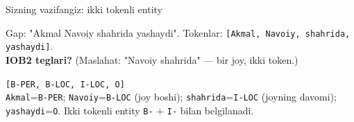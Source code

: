 \documentclass[aspectratio=169,11pt]{beamer}
\begin{document}
\begin{frame}{Sizning vazifangiz: ikki tokenli entity}
  \begin{tcolorbox}[warnbox,title=Savol --- 90 soniya]
    \small
    Gap: "Akmal Navoiy shahrida yashaydi". Tokenlar:
    \texttt{[Akmal, Navoiy, shahrida, yashaydi]}.\\[4pt]
    \textbf{\large IOB2 teglari? } (Maslahat: "Navoiy shahrida" --- bir joy, ikki token.)
  \end{tcolorbox}
  \pause
  \begin{tcolorbox}[okbox,title=Javob]
    \small
    \texttt{[B-PER, B-LOC, I-LOC, O]}\\[3pt]
    \footnotesize \texttt{Akmal}=\texttt{B-PER}; \texttt{Navoiy}=\texttt{B-LOC} (joy boshi);
    \texttt{shahrida}=\texttt{I-LOC} (joyning davomi); \texttt{yashaydi}=\texttt{O}.
    Ikki tokenli entity \texttt{B-} $+$ \texttt{I-} bilan belgilanadi.
  \end{tcolorbox}
\end{frame}
\end{document}
